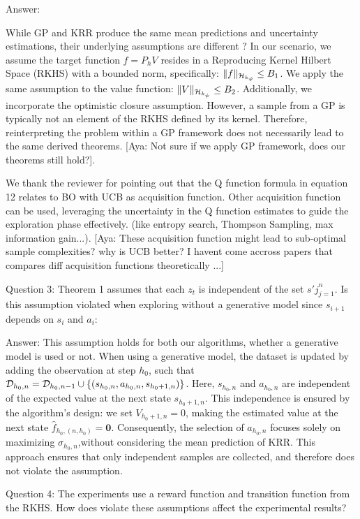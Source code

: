 \documentclass{article}
\begin{document}
Answer:

While GP and KRR produce the same mean predictions and uncertainty estimations, their underlying assumptions are different ? In our scenario, we assume the target function $f=P_hV$ resides in a Reproducing Kernel Hilbert Space (RKHS) with a bounded norm, specifically:  $\|f\|_{\mathcal{H}_{k_\varphi}}\le B_1$. We apply the same assumption to the value function:  $\|V\|_{\mathcal{H}_{k_\psi}}\le B_2$. Additionally, we incorporate the optimistic closure assumption. However, a sample from a GP is typically not an element of the RKHS defined by its kernel. Therefore, reinterpreting the problem within a GP framework does not necessarily lead to the same derived theorems. [Aya: Not sure if we apply GP framework, does our theorems still hold?].

We thank the reviewer for pointing out that the Q function formula in equation 12 relates to BO with UCB as acquisition function. Other acquisition function can be used, leveraging the uncertainty in the Q function estimates to guide the exploration phase effectively. (like entropy search, Thompson Sampling, max information gain...). [Aya: These acquisition function might lead to sub-optimal sample complexities? why is UCB better? I havent come accross papers that compares diff acquisition functions theoretically ...]

Question 3: Theorem 1 assumes that each $z_t$ is independent of the set ${s'j}_{j=1}^{n}$. Is this assumption violated when exploring without a generative model since $s_{i+1}$ depends on $s_i$ and $a_i$:

Answer: This assumption holds for both our algorithms, whether a generative model is used or not. When using a generative model, the dataset is updated by adding the observation at step $h_0$, such that $\mathcal{D}_{h_0,n} = \mathcal{D}_{h_0,n-1}\cup \{(s_{h_0,n}, a_{h_0,n}, s_{h_0+1,n})\}$. Here, $s_{h_0,n}$ and $a_{h_0,n}$ are independent of the expected value at the next state $s_{h_0+1,n}$. This independence is ensured by the algorithm's design: we set $V_{h_0+1,n}=0$, making the estimated value at the next state  $\hat{f}_{h_0,(n,h_0)}=\bm{0}$. Consequently, the selection of $a_{h_0,n}$ 
focuses solely on maximizing $\sigma_{h_0,n}$,without considering the mean prediction of KRR. This approach ensures that only independent samples are collected, and therefore does not violate the assumption.

Question 4: The experiments use a reward function and transition function from the RKHS. How does violate these assumptions affect the experimental results?
\end{document}
